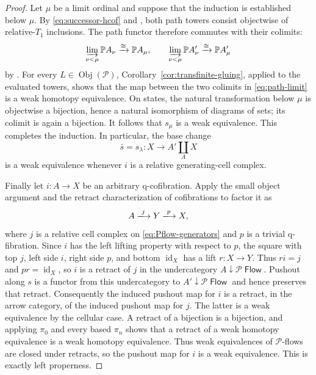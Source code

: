 \documentclass[12pt,a4paper]{amsart}
\newcommand{\Pcat}{\mathcal P}
\newcommand{\PFlow}{\Pcat\mathop{\mathsf{Flow}}}
\newcommand{\Path}{\mathbb P}
\newcommand{\id}{\operatorname{id}}
\newcommand{\Obj}{\operatorname{Obj}}
\newcommand{\liminj}{\varinjlim}
\theoremstyle{definition}
\begin{document}
\begin{proof}
Let \(\mu\) be a limit ordinal and suppose that the induction is established below \(\mu\).  By \eqref{eq:successor-hcof} and \cite[Proposition~2.6]{leftproperflow}, both path towers consist objectwise of relative-\(T_1\) inclusions.  The path functor therefore commutes with their colimits:
\begin{equation}\label{eq:path-limit}
 \liminj_{\nu<\mu}\Path A_\nu\xrightarrow{\cong}\Path A_\mu,
 \qquad
 \liminj_{\nu<\mu}\Path A'_\nu\xrightarrow{\cong}\Path A'_\mu
\end{equation}
by \cite[Theorem~6.14]{Moore1}.  For every \(L\in\Obj(\Pcat)\), Corollary~\ref{cor:transfinite-gluing}, applied to the evaluated towers, shows that the map between the two colimits in \eqref{eq:path-limit} is a weak homotopy equivalence.  On states, the natural transformation below \(\mu\) is objectwise a bijection, hence a natural isomorphism of diagrams of sets; its colimit is again a bijection.  It follows that \(s_\mu\) is a weak equivalence.  This completes the induction.  In particular, the base change
\[
 \bar s=s_\lambda: X\longrightarrow
 A'\mathop{\coprod}_{A}X
\]
is a weak equivalence whenever \(i\) is a relative generating-cell complex.

Finally let \(i: A\to X\) be an arbitrary q-cofibration.  Apply the small object argument and the retract characterization of cofibrations \cite[Theorem~2.1.14 and Corollary~2.1.15]{MR99h:55031} to factor it as
\[
 A\xlongrightarrow{j}Y\xlongrightarrow{p}X,
\]
where \(j\) is a relative cell complex on \eqref{eq:Pflow-generators} and \(p\) is a trivial q-fibration.  Since \(i\) has the left lifting property with respect to \(p\), the square with top \(j\), left side \(i\), right side \(p\), and bottom \(\id_X\) has a lift \(r: X\to Y\).  Thus \(ri=j\) and \(pr=\id_X\), so \(i\) is a retract of \(j\) in the undercategory \(A\downarrow\PFlow\).  Pushout along \(s\) is a functor from this undercategory to \(A'\downarrow\PFlow\) and hence preserves that retract.  Consequently the induced pushout map for \(i\) is a retract, in the arrow category, of the induced pushout map for \(j\).  The latter is a weak equivalence by the cellular case.  A retract of a bijection is a bijection, and applying \(\pi_0\) and every based \(\pi_n\) shows that a retract of a weak homotopy equivalence is a weak homotopy equivalence.  Thus weak equivalences of \(\Pcat\)-flows are closed under retracts, so the pushout map for \(i\) is a weak equivalence.  This is exactly left properness.
\end{proof}
\end{document}
